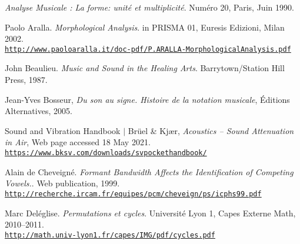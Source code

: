 \renewcommand{\bibname}{References
}

\renewcommand\bibpreamble{$\rightarrow$ The references to go further or deeper for advanced readers are prepended by an asterisk.}

\begin{thebibliography}{99}
\thispagestyle{empty}
		
	\textit{Analyse Musicale : La forme: unit\'{e} et multiplicit\'{e}}. Num\'{e}ro 20, Paris, Juin 1990.
	
	Paolo Aralla. \textit{Morphological Analysis}. in PRISMA 01, Euresis Edizioni, Milan 2002.\\ 
	\href{http://www.paoloaralla.it/doc-pdf/P.ARALLA-MorphologicalAnalysis.pdf}{\scriptsize{\texttt{http://www.paoloaralla.it/doc-pdf/P.ARALLA-MorphologicalAnalysis.pdf}}} \normalsize{}
	
	John Beaulieu. \textit{Music and Sound in the Healing Arts}. Barrytown/Station Hill Press, 1987.
	
	Jean-Yves Bosseur, \textit{Du son au signe. Histoire de la notation musicale}, \'{E}ditions Alternatives, 2005.
	
	Sound and Vibration Handbook $|$ Br\"uel \& Kj\ae r, \textit{Acoustics -- Sound Attenuation in Air}, Web page accessed 18 May 2021.\\ 
	\href{https://www.bksv.com/downloads/svpockethandbook/}{\scriptsize{\texttt{https://www.bksv.com/downloads/svpockethandbook/}}} \normalsize{}
		
	Alain de Cheveign\'{e}. \textit{Formant Bandwidth Affects the Identification of Competing Vowels.}. Web publication, 1999.\\ \href{http://recherche.ircam.fr/equipes/pcm/cheveign/ps/icphs99.pdf}{\scriptsize{\texttt{http://recherche.ircam.fr/equipes/pcm/cheveign/ps/icphs99.pdf}}} \normalsize{}

		
	Marc Del\'{e}glise. \textit{Permutations et cycles}. Universit\'{e} Lyon 1, Capes Externe Math, 2010--2011.\\ \href{http://math.univ-lyon1.fr/capes/IMG/pdf/cycles.pdf}{\scriptsize{\texttt{http://math.univ-lyon1.fr/capes/IMG/pdf/cycles.pdf}}} \normalsize{}
	

\end{thebibliography}
